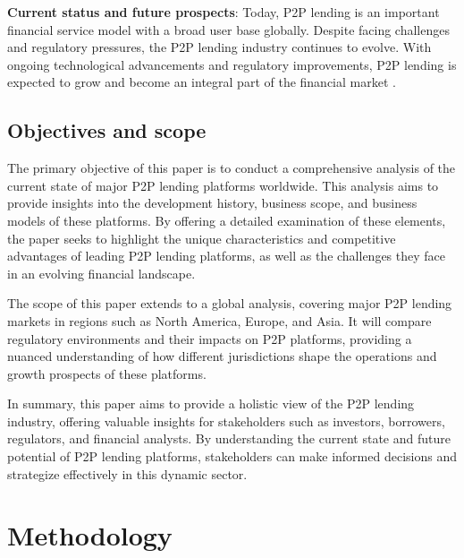 \documentclass{article}
\begin{document}
\textbf{Current status and future prospects}: Today, P2P lending is an important financial service model with a broad user base globally. Despite facing challenges and regulatory pressures, the P2P lending industry continues to evolve. With ongoing technological advancements and regulatory improvements, P2P lending is expected to grow and become an integral part of the financial market \citep{lin_judging_2013}.

\subsection{Objectives and scope}
The primary objective of this paper is to conduct a comprehensive analysis of the current state of major P2P lending platforms worldwide. This analysis aims to provide insights into the development history, business scope, and business models of these platforms. By offering a detailed examination of these elements, the paper seeks to highlight the unique characteristics and competitive advantages of leading P2P lending platforms, as well as the challenges they face in an evolving financial landscape.

The scope of this paper extends to a global analysis, covering major P2P lending markets in regions such as North America, Europe, and Asia. It will compare regulatory environments and their impacts on P2P platforms, providing a nuanced understanding of how different jurisdictions shape the operations and growth prospects of these platforms.

In summary, this paper aims to provide a holistic view of the P2P lending industry, offering valuable insights for stakeholders such as investors, borrowers, regulators, and financial analysts. By understanding the current state and future potential of P2P lending platforms, stakeholders can make informed decisions and strategize effectively in this dynamic sector.

\section{Methodology}
\end{document}

